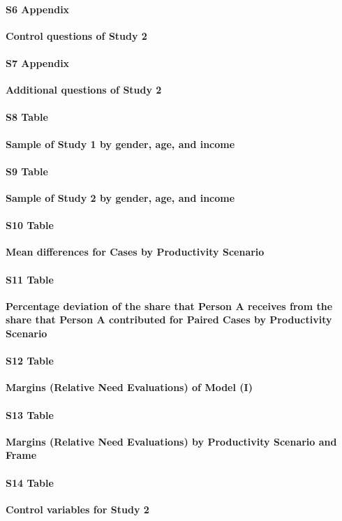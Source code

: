 \documentclass[10pt,letterpaper]{article}
\begin{document}
\paragraph*{S6 Appendix}
\label{sec:app_study_2_control_questions}
{\bf Control questions of Study 2}

\paragraph*{S7 Appendix}
\label{sec:app_study_2_additional_questions}
{\bf Additional questions of Study 2}

\paragraph*{S8 Table}
\label{tab:app_study_1_quota}
{\bf Sample of Study 1 by gender, age, and income}

\paragraph*{S9 Table}
\label{tab:app_study_2_quota}
{\bf Sample of Study 2 by gender, age, and income}

\paragraph*{S10 Table}
\label{tab:app_study_2_mean}
{\bf Mean differences for Cases by Productivity Scenario}

\paragraph*{S11 Table}
\label{tab:app_study_2_percentage}
{\bf Percentage deviation of the share that Person A receives from the share that Person A contributed for Paired Cases by Productivity Scenario}

\paragraph*{S12 Table}
\label{tab:app_study_2_margins_i}
{\bf Margins (Relative Need Evaluations) of Model (I)}

\paragraph*{S13 Table}
\label{tab:app_study_2_margins_ii}
{\bf Margins (Relative Need Evaluations) by Productivity Scenario and Frame}

\paragraph*{S14 Table}
\label{tab:app_study_2_control_variables}
{\bf Control variables for Study 2}
\end{document}
